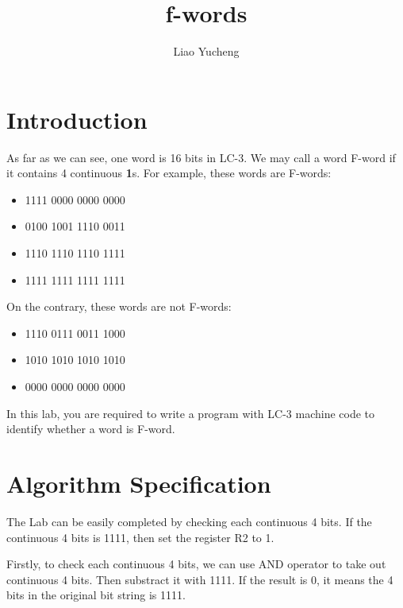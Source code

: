 \documentclass[twoside]{article}
\begin{document}
\begin{CJK*}{UTF8}{gbsn}
	\title{f-words}
	\author{Liao Yucheng}
	\maketitle

	\section{Introduction}

	As far as we can see, one word is 16 bits in LC-3. We may call a word F-word if it contains 4 continuous \textbf{1}s. For example, these words are F-words:
	\begin{itemize}
		\item 1111 0000 0000 0000 
		\item 0100 1001 1110 0011 
		\item 1110 1110 1110 1111 
		\item 1111 1111 1111 1111
	\end{itemize}

	On the contrary, these words are not F-words:
	\begin{itemize}
		\item 1110 0111 0011 1000 
		\item 1010 1010 1010 1010 
		\item 0000 0000 0000 0000
	\end{itemize}

	In this lab, you are required to write a program with LC-3 machine code to identify whether a word is F-word.

	\section{Algorithm Specification}
	The Lab can be easily completed by checking each continuous 4 bits. If the continuous 4 bits is 1111, then set the register R2 to 1.
	
	Firstly, to check each continuous 4 bits, we can use AND operator to take out continuous 4 bits. Then substract it with 1111. If the result is 0, it means the 4 bits in the original bit string is 1111.
	

\end{CJK*}
\end{document}
